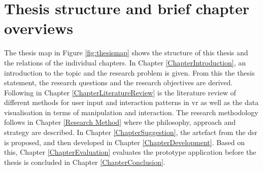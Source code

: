 



\section{Thesis structure and brief chapter overviews}

The thesis map in Figure \ref{fig:thesismap} shows the structure of this thesis and the relations of the individual chapters. In Chapter \ref{ChapterIntroduction}, an introduction to the topic and the research problem is given. From this the thesis statement, the research questions and the research objectives are derived. Following in Chapter \ref{ChapterLiteratureReview} is the literature review of different methods for user input and interaction patterns in \gls{vr} as well as the data visualisation in terms of manipulation and interaction. The research methodology follows in Chapter \ref{Research Method} where the philosophy, approach and strategy are described. In Chapter \ref{ChapterSuggestion}, the artefact from the \gls{dsr} is proposed, and then developed in Chapter \ref{ChapterDevelopment}. Based on this, Chapter \ref{ChapterEvaluation} evaluates the prototype application before the thesis is concluded in Chapter \ref{ChapterConclusion}.
